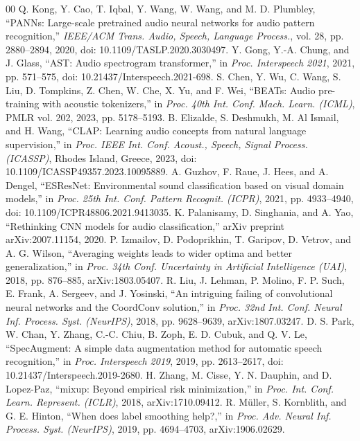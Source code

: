 \documentclass[conference]{IEEEtran}
\begin{document}
\begin{thebibliography}{00}
 Q. Kong, Y. Cao, T. Iqbal, Y. Wang, W. Wang, and M. D. Plumbley, ``PANNs: Large-scale pretrained audio neural networks for audio pattern recognition,'' \textit{IEEE/ACM Trans. Audio, Speech, Language Process.}, vol. 28, pp. 2880--2894, 2020, doi: 10.1109/TASLP.2020.3030497.
 Y. Gong, Y.-A. Chung, and J. Glass, ``AST: Audio spectrogram transformer,'' in \textit{Proc. Interspeech 2021}, 2021, pp. 571--575, doi: 10.21437/Interspeech.2021-698.
 S. Chen, Y. Wu, C. Wang, S. Liu, D. Tompkins, Z. Chen, W. Che, X. Yu, and F. Wei, ``BEATs: Audio pre-training with acoustic tokenizers,'' in \textit{Proc. 40th Int. Conf. Mach. Learn. (ICML)}, PMLR vol. 202, 2023, pp. 5178--5193.
 B. Elizalde, S. Deshmukh, M. Al Ismail, and H. Wang, ``CLAP: Learning audio concepts from natural language supervision,'' in \textit{Proc. IEEE Int. Conf. Acoust., Speech, Signal Process. (ICASSP)}, Rhodes Island, Greece, 2023, doi: 10.1109/ICASSP49357.2023.10095889.
 A. Guzhov, F. Raue, J. Hees, and A. Dengel, ``ESResNet: Environmental sound classification based on visual domain models,'' in \textit{Proc. 25th Int. Conf. Pattern Recognit. (ICPR)}, 2021, pp. 4933--4940, doi: 10.1109/ICPR48806.2021.9413035.
 K. Palanisamy, D. Singhania, and A. Yao, ``Rethinking CNN models for audio classification,'' arXiv preprint arXiv:2007.11154, 2020.
 P. Izmailov, D. Podoprikhin, T. Garipov, D. Vetrov, and A. G. Wilson, ``Averaging weights leads to wider optima and better generalization,'' in \textit{Proc. 34th Conf. Uncertainty in Artificial Intelligence (UAI)}, 2018, pp. 876--885, arXiv:1803.05407.
 R. Liu, J. Lehman, P. Molino, F. P. Such, E. Frank, A. Sergeev, and J. Yosinski, ``An intriguing failing of convolutional neural networks and the CoordConv solution,'' in \textit{Proc. 32nd Int. Conf. Neural Inf. Process. Syst. (NeurIPS)}, 2018, pp. 9628--9639, arXiv:1807.03247.
 D. S. Park, W. Chan, Y. Zhang, C.-C. Chiu, B. Zoph, E. D. Cubuk, and Q. V. Le, ``SpecAugment: A simple data augmentation method for automatic speech recognition,'' in \textit{Proc. Interspeech 2019}, 2019, pp. 2613--2617, doi: 10.21437/Interspeech.2019-2680.
 H. Zhang, M. Cisse, Y. N. Dauphin, and D. Lopez-Paz, ``mixup: Beyond empirical risk minimization,'' in \textit{Proc. Int. Conf. Learn. Represent. (ICLR)}, 2018, arXiv:1710.09412.
 R. M\"uller, S. Kornblith, and G. E. Hinton, ``When does label smoothing help?,'' in \textit{Proc. Adv. Neural Inf. Process. Syst. (NeurIPS)}, 2019, pp. 4694--4703, arXiv:1906.02629.

\end{thebibliography}
\end{document}
